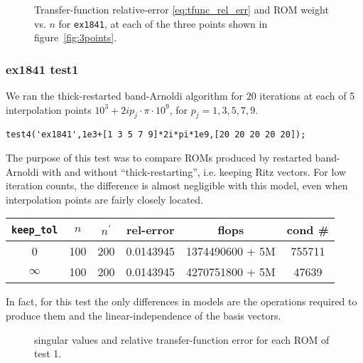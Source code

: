 \begin{figure}
\centering
{}
\vfill
{}
\vfill
{}
\vfill
\caption{\label{fig:1841benchmarks} Transfer-function relative-error \eqref{eq:tfunc_rel_err} and ROM weight vs. $n$ for \texttt{ex1841}, at each of the three points shown in figure~\ref{fig:3points}.    }
\end{figure}


\clearpage
\subsubsection{ex1841 test1}
We ran the thick-restarted band-Arnoldi algorithm for $20$ iterations at each of 5 interpolation points $10^3 + 2i p_j \cdot\pi\cdot10^9$, for $p_j = 1,3,5,7,9$.
\begin{verbatim}
test4('ex1841',1e3+[1 3 5 7 9]*2i*pi*1e9,[20 20 20 20 20]);
\end{verbatim}

The purpose of this test was to compare ROMs produced by restarted band-Arnoldi with and without ``thick-restarting'', i.e. keeping Ritz vectors.  For low iteration counts, the difference is almost negligible with this model, even when interpolation points are fairly closely located.

\smallskip
\begin{tabular}{|c|c|c|c|c|c|}
\hline
\texttt{keep\_tol} & $n$ &  $n^\prime$ & rel-error & flops & cond \# \\
\hline
0 & 100 & 200 &  0.0143945 &  1374490600 + 5M &  755711 \\
$\infty$ & 100 & 200 &  0.0143945 & 4270751800 + 5M & 47639 \\
\hline
\end{tabular}
\smallskip

In fact, for this test the only differences in models are the operations required to produce them and the linear-independence of the basis vectors.

\begin{figure}
\centering
{}

\caption{singular values and relative transfer-function error for each ROM of test 1.}
\end{figure}

